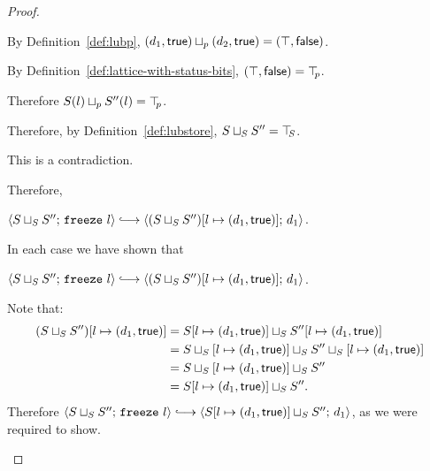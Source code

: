 \begin{proof}
\begin{itemize}
\begin{itemize}
\begin{itemize}
          By Definition~\ref{def:lubp},
          $(d_1, \textsf{true}) \sqcup_p (d_2, \textsf{true})
          = (\top, \textsf{false})$.

          By Definition~\ref{def:lattice-with-status-bits},
          $(\top, \textsf{false}) = \top\hspace{-0.85mm}_{p}$.

          Therefore $S(l) \sqcup_p S''(l) = \top\hspace{-0.85mm}_{p}$.

          Therefore, by Definition~\ref{def:lubstore},
          $S \sqcup_{S} S'' = \top\hspace{-0.85mm}_{S}$.

          This is a contradiction.

          Therefore,

          $\config{\lubstore{S}{S''}}{\freeze{l}}
          \parstepsto
          \config{\extS{(\lubstore{S}{S''})}{l}{d_1}{\frozentrue}}{d_1}$.
        \end{itemize}
      \end{itemize}

      In each case we have shown that

      $\config{\lubstore{S}{S''}}{\freeze{l}} \parstepsto
      \config{\extS{(\lubstore{S}{S''})}{l}{d_1}{\frozentrue}}{d_1}$.

      Note that:
      \begin{align*}
        (S \sqcup_{S} S'')[l \mapsto (d_1, \textsf{true})] &=
        S[l \mapsto (d_1, \textsf{true})] \sqcup_{S} S''[l \mapsto (d_1, \textsf{true})] \\
        &= S \sqcup_{S} \left[ l \mapsto (d_1, \textsf{true}) \right] \sqcup_{S} S'' \sqcup_{S} \left[ l \mapsto (d_1, \textsf{true}) \right] \\
        &= S \sqcup_{S} \left[ l \mapsto (d_1, \textsf{true}) \right] \sqcup_{S} S'' \\
        &= S[l \mapsto (d_1, \textsf{true})] \sqcup_{S} S''.
      \end{align*}
      Therefore
      $\config{\lubstore{S}{S''}}{\freeze{l}}
      \parstepsto
      \config{\lubstore{\extS{S}{l}{d_1}{\frozentrue}}{S''}}{d_1}$,
      as we were required to show.
  \end{itemize}
\end{proof}
